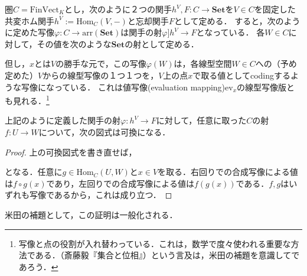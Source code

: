 \documentclass[uplatex, 12pt, dvipdfmx]{jsreport}
\begin{document}
圏$C=\mathrm{FinVect}_K$とし，次のように２つの関手$h^V,F:C\to\mathbf{Set}$を$V\in C$を固定した共変ホム関手$h^V:=\mathrm{Hom}_C(V,-)$と忘却関手$F$として定める．
すると，次のように定めた写像$\varphi :C\to \mathrm{arr}(\mathbf{Set})$は関手の射$\varphi ]h^V\to F$となっている．
各$W\in C$に対して，その値を次のような$\mathbf{Set}$の射として定める．
\begin{center}\end{center}
但し，$x$とは$V$の勝手な元で，この写像$\varphi (W)$は，各線型空間$W\in C$への（予め定めた）$V$からの線型写像の１つ１つを，$V$上の点$x$で取る値としてcodingするような写像になっている．
これは値写像(evaluation mapping)$\mathrm{ev}_x$の線型写像版とも見れる．\footnote{写像と点の役割が入れ替わっている．これは，数学で度々使われる重要な方法である．（斎藤毅『集合と位相』）という言及は，米田の補題を意識してであろう．}

\begin{proposition} \label{prop-welldefinedness1}
    上記のように定義した関手の射$\varphi :h^V\to F$に対して，任意に取った$C$の射$f:U\to W$について，次の図式は可換になる．
    \begin{center}\end{center}
\end{proposition}
\begin{proof}
    上の可換図式を書き直せば，
    \begin{center}\end{center}
    となる．任意に$g\in\mathrm{Hom}_C(U,W)$と$x\in V$を取る．右回りでの合成写像による値は$f\circ g(x)$であり，左回りでの合成写像による値は$f(g(x))$である．$f,g$はいずれも写像であるから，これは成り立つ．
\end{proof}
\begin{remark}
    米田の補題として，この証明は一般化される．
\end{remark}
\end{document}
